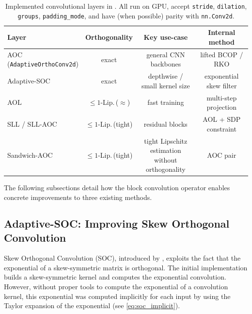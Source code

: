     \begin{table}[ht]
        \centering
    \caption{Implemented convolutional layers in \Orthogonium.  All run on
    GPU, accept \texttt{stride}, \texttt{dilation}, \texttt{groups},
    \texttt{padding\_mode}, and have (when possible) parity with \texttt{nn.Conv2d}.}
    \label{tab:conv_summary}
    \small
    \begin{tabular}{lccc}
    \toprule
    Layer & Orthogonality & Key use-case & Internal method\\
    \midrule
    \makecell[l]{AOC\\(\texttt{AdaptiveOrthoConv2d})} & exact & general CNN backbones & lifted BCOP / RKO\\
    Adaptive-SOC & exact & \makecell[c]{depthwise /\\small kernel size} & exponential skew filter\\
    AOL & $\le1$-Lip.\,($\approx$) & fast training & multi-step projection\\
    SLL / SLL-AOC & $\le1$-Lip.\,(tight) & residual blocks & AOL + SDP constraint\\
    Sandwich-AOC & $\le1$-Lip.\,(tight) & \makecell[c]{tight Lipschitz estimation\\without orthogonality} & AOC pair\\
    \bottomrule
    \end{tabular}
    \end{table}

    The following subsections detail how the block convolution operator enables concrete improvements to three existing methods.

    \subsection{Adaptive-SOC: Improving Skew Orthogonal Convolution}
    \label{sec:improving_soc}

    Skew Orthogonal Convolution (SOC), introduced by \cite{singla_improved_2022}, exploits the fact that the exponential of a skew-symmetric matrix is orthogonal. The initial implementation builds a skew-symmetric kernel and computes the exponential convolution. However, without proper tools to compute the exponential of a convolution kernel, this exponential was computed implicitly for each input by using the Taylor expansion of the exponential (see \cref{eq:soc_implicit}).

